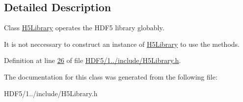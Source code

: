 \subsection{Detailed Description}
Class \hyperlink{class_h5_1_1_h5_library}{H5\+Library} operates the H\+D\+F5 library globably. 

It is not neccessary to construct an instance of \hyperlink{class_h5_1_1_h5_library}{H5\+Library} to use the methods. 

Definition at line \hyperlink{_h_d_f5_21_810_81_2include_2_h5_library_8h_source_l00026}{26} of file \hyperlink{_h_d_f5_21_810_81_2include_2_h5_library_8h_source}{H\+D\+F5/1../include/\+H5\+Library.\+h}.



The documentation for this class was generated from the following file\+:\begin{DoxyCompactItemize}
\item 
H\+D\+F5/1../include/\+H5\+Library.\+h\end{DoxyCompactItemize}
